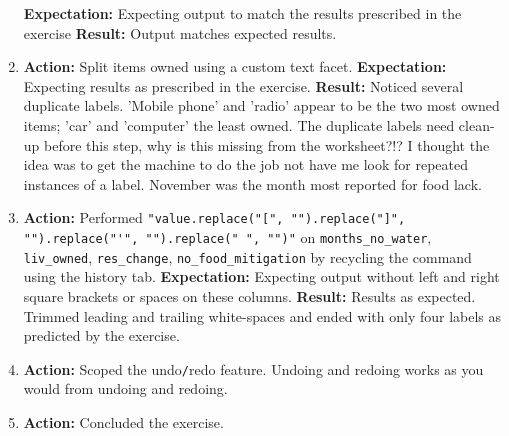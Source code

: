 \documentclass{article}
\begin{document}
\begin{enumerate}
    \subitem \textbf{Expectation: }Expecting output to match the results prescribed in the exercise
    \subitem \textbf{Result: }Output matches expected results.
    \item \textbf{Action: }Split items owned using a custom text facet.
    \subitem \textbf{Expectation: }Expecting results as prescribed in the exercise.
    \subitem \textbf{Result: }Noticed several duplicate labels. 'Mobile phone' and 'radio' appear to be the two most owned items; 'car' and 'computer' the least owned. The duplicate labels need clean-up before this step, why is this missing from the worksheet?!? I thought the idea was to get the machine to do the job not have me look for repeated instances of a label. November was the month most reported for food lack.
    \item \textbf{Action: }Performed \newline \verb|"value.replace("[", "").replace("]", "").replace("'", "").replace(" ", "")"| on \verb|months_no_water|, \verb|liv_owned|, \verb|res_change|, \verb|no_food_mitigation| by recycling the command using the history tab.
    \subitem \textbf{Expectation: }Expecting output without left and right square brackets or spaces on these columns.
    \subitem \textbf{Result: }Results as expected. Trimmed leading and trailing white-spaces and ended with only four labels as predicted by the exercise.
    \item \textbf{Action: }Scoped the undo\verb|/|redo feature. Undoing and redoing works as you would from undoing and redoing.
    \item \textbf{Action: }Concluded the exercise.
\end{enumerate}
\end{document}
